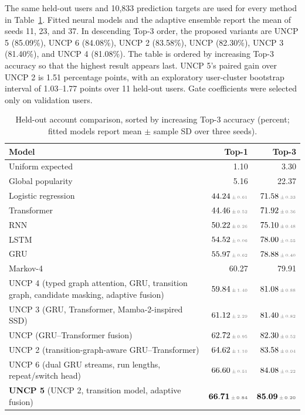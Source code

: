 The same held-out users and 10,833 prediction targets are used for every method in Table~\ref{tab:compact-results}. Fitted neural models and the adaptive ensemble report the mean of seeds 11, 23, and 37. In descending Top-3 order, the proposed variants are UNCP 5 (85.09\%), UNCP 6 (84.08\%), UNCP 2 (83.58\%), UNCP (82.30\%), UNCP 3 (81.40\%), and UNCP 4 (81.08\%). The table is ordered by increasing Top-3 accuracy so that the highest result appears last. UNCP 5's paired gain over UNCP 2 is 1.51 percentage points, with an exploratory user-cluster bootstrap interval of 1.03--1.77 points over 11 held-out users. Gate coefficients were selected only on validation users.

\newcommand{\modeldetail}[1]{{\footnotesize\color{uncptealdark}(#1)}}
\newcommand{\score}[2]{#1\,{\color{black!55}\scriptscriptstyle\pm\,#2}}
\newcommand{\uncpbase}{UNCP \modeldetail{GRU--Transformer fusion}}
\newcommand{\uncptwo}{UNCP 2 \modeldetail{transition-graph-aware GRU--Transformer}}
\newcommand{\uncpthree}{UNCP 3 \modeldetail{GRU, Transformer, Mamba-2-inspired SSD}}
\newcommand{\uncpfour}{UNCP 4 \modeldetail{typed graph attention, GRU, transition graph, candidate masking, adaptive fusion}}
\newcommand{\uncpfive}{\textbf{UNCP 5} \modeldetail{UNCP 2, transition model, adaptive fusion}}
\newcommand{\uncpsix}{UNCP 6 \modeldetail{dual GRU streams, run lengths, repeat/switch head}}

\begin{table}[!htbp]
\centering
\caption{Held-out account comparison, sorted by increasing Top-3 accuracy (percent; fitted models report mean $\pm$ sample SD over three seeds).}
\label{tab:compact-results}
\small
\begin{tabular}{@{}p{.53\linewidth}rr@{}}
\toprule
Model & Top-1 & Top-3 \\
\midrule
Uniform expected & 1.10 & 3.30 \\
Global popularity & 5.16 & 22.37 \\
Logistic regression & $\score{44.24}{0.61}$ & $\score{71.58}{0.33}$ \\
Transformer & $\score{44.46}{0.52}$ & $\score{71.92}{0.36}$ \\
RNN & $\score{50.22}{0.26}$ & $\score{75.10}{0.48}$ \\
LSTM & $\score{54.52}{0.06}$ & $\score{78.00}{0.55}$ \\
GRU & $\score{55.97}{0.62}$ & $\score{78.88}{0.40}$ \\
Markov-4 & 60.27 & 79.91 \\
\uncpfour & $\score{59.84}{1.40}$ & $\score{81.08}{0.88}$ \\
\uncpthree & $\score{61.12}{2.29}$ & $\score{81.40}{0.82}$ \\
\uncpbase & $\score{62.72}{0.95}$ & $\score{82.30}{0.52}$ \\
\uncptwo & $\score{64.62}{1.10}$ & $\score{83.58}{0.04}$ \\
\uncpsix & $\score{66.60}{0.51}$ & $\score{84.08}{0.22}$ \\
\uncpfive & $\mathbf{\score{66.71}{0.84}}$ & $\mathbf{\score{85.09}{0.20}}$ \\
\bottomrule
\end{tabular}
\end{table}


